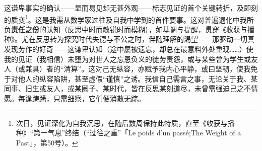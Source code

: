 这谦卑事实的确认——显而易见却无甚外观——标志见证的首个关键转折，及即刻的质变\footnote{次日，见证深化为自我沉思，在随后数周保持此特质，直至《收获与播种》“第一气息”终结（“过往之重”「Le poids d'un passé;The Weight of a Past」，第50号）。}。这是我需从数学家过往及自我中学到的首件要事。这对普遍退化中我所负\textbf{责任之份}的认知（反思中时而敏锐时而模糊），如基调与提醒，贯穿《收获与播种》。尤在反思转为探究时代失德与不公之时，伴随理解的渴望——那驱动一切真发现劳作的好奇——这谦卑认知（途中屡被遗忘，却总在最意料外处重现……）使我的见证（我相信）未堕为对世人之忘恩负义的徒劳责怨，或与某些曾为学生或友人（或兼具）者的“清算”。这对己无纵容，亦赋予我内心平静，或曰坚韧，使我免于对他人的纵容陷阱，甚至虚假“谨慎”之诱。我信自己需言之事，无论关于我、某同事、旧生或友人，或某圈子、某时代，皆在反思某刻道尽，未曾需强迫己之不情愿。每逢踌躇，只需细察，它们便消散无踪。